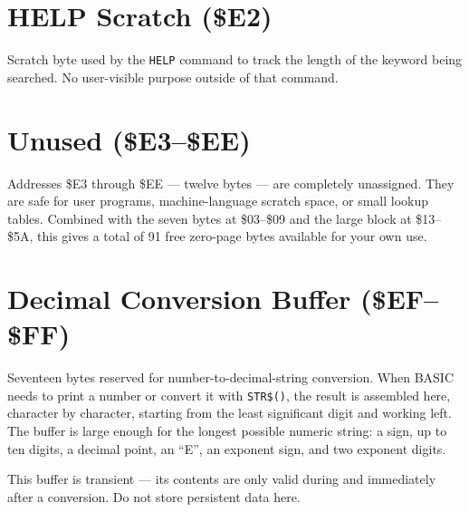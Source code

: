 \section{HELP Scratch (\$E2)}


Scratch byte used by the \texttt{HELP} command to track the length of the
keyword being searched.  No user-visible purpose outside of that command.

\section{Unused (\$E3--\$EE)}

Addresses \$E3 through \$EE --- twelve bytes --- are completely unassigned.
They are safe for user programs, machine-language scratch space, or small
lookup tables.  Combined with the seven bytes at \$03--\$09 and the large
block at \$13--\$5A, this gives a total of 91 free zero-page bytes available
for your own use.

\section{Decimal Conversion Buffer (\$EF--\$FF)}


Seventeen bytes reserved for number-to-decimal-string conversion.  When BASIC
needs to print a number or convert it with \texttt{STR\$()}, the result is
assembled here, character by character, starting from the least significant
digit and working left.  The buffer is large enough for the longest possible
numeric string: a sign, up to ten digits, a decimal point, an ``E'', an
exponent sign, and two exponent digits.

This buffer is transient --- its contents are only valid during and
immediately after a conversion.  Do not store persistent data here.


